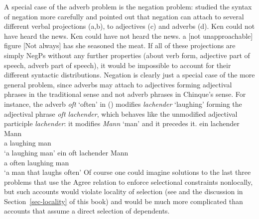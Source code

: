 A special case of the adverb problem is the negation
problem: \citet{Ernst92a} studied the syntax of negation more carefully and pointed out that
negation can attach to several different verbal projections (a,b), to adjectives (c)
and adverbs (d).
\eal
\ex Ken could not have heard the news.
\ex Ken could have not heard the news.
\ex a [not unapproachable] figure
\ex {}[Not always] has she seasoned the meat.
\zl
If all of these projections are simply NegPs without any further properties (about verb form, adjective
part of speech, adverb part of speech), it would be impossible to account for their different
syntactic distributions. Negation is clearly just a special case of the more general problem, since
adverbs may attach to adjectives forming adjectival phrases in the traditional sense and not adverb
phrases in Chinque's sense. For instance, the adverb \emph{oft} `often' in () modifies
\emph{lachender} `laughing' forming the adjectival phrase \emph{oft lachender}, which behaves like the
unmodified adjectival participle \emph{lachender}: it modifies \emph{Mann} `man' and it precedes it.
\eal
\ex
\gll ein lachender Mann\\
     a   laughing man\\
\glt `a laughing man'
\ex
\gll ein oft lachender Mann\\
     a   often laughing man\\
\glt `a man that laughs often'
\zl     
Of course one could imagine solutions to the last three problems that use the Agree relation to enforce selectional
constraints nonlocally, but such accounts would violate locality of selection (see \citealp[]{Ernst92a} and the discussion in
Section~\ref{sec-locality} of this book) and would be much more complicated than accounts
that assume a direct selection of dependents.


